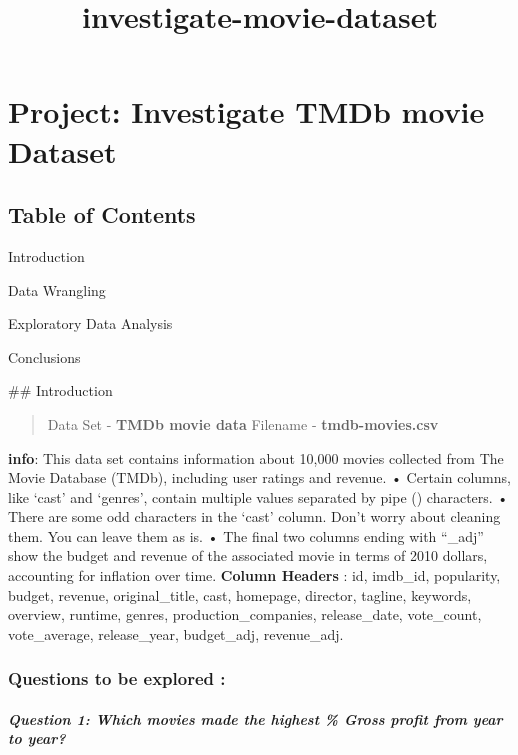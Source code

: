 \documentclass[11pt]{article}
\title{investigate-movie-dataset}
\begin{document}
    
    
    \maketitle
    
    

    
    \section{Project: Investigate TMDb movie
Dataset}\label{project-investigate-tmdb-movie-dataset}

\subsection{Table of Contents}\label{table-of-contents}

Introduction

Data Wrangling

Exploratory Data Analysis

Conclusions

     \#\# Introduction

\begin{quote}
Data Set - \textbf{TMDb movie data} Filename - \textbf{tmdb-movies.csv}
\end{quote}

\textbf{info}: This data set contains information about 10,000 movies
collected from The Movie Database (TMDb), including user ratings and
revenue. • Certain columns, like `cast' and `genres', contain multiple
values separated by pipe (\textbar{}) characters. • There are some odd
characters in the `cast' column. Don't worry about cleaning them. You
can leave them as is. • The final two columns ending with ``\_adj'' show
the budget and revenue of the associated movie in terms of 2010 dollars,
accounting for inflation over time. \textbf{Column Headers} : id,
imdb\_id, popularity, budget, revenue, original\_title, cast, homepage,
director, tagline, keywords, overview, runtime, genres,
production\_companies, release\_date, vote\_count, vote\_average,
release\_year, budget\_adj, revenue\_adj.

\subsubsection{Questions to be explored
:}\label{questions-to-be-explored}

\subparagraph{Question 1: Which movies made the highest \% Gross profit
from year to
year?}\label{question-1-which-movies-made-the-highest-gross-profit-from-year-to-year}
\end{document}
